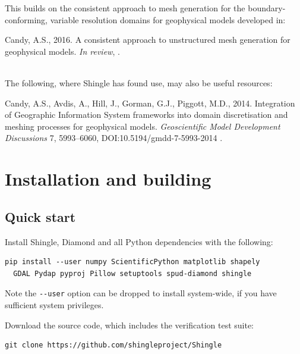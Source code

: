 \documentclass[a4paper, 10pt]{book}
\providecommand{\shingle}{Shingle\xspace}
\begin{document}
\medskip
\noindent
This builds on the consistent approach to mesh generation for the boundary-conforming, variable resolution domains for  geophysical models developed in:
\par\vskip 4pt\noindent\hspace{0.02\columnwidth}%
\begin{minipage}{0.9\columnwidth}%
Candy, A.S., 2016. A consistent approach to unstructured mesh generation for geophysical models. \emph{In review}, \citep{candybrep}.
\end{minipage}
\\

\medskip
\noindent
The following, where \shingle has found use, may also be useful resources:
\par\vskip 4pt\noindent\hspace{0.02\columnwidth}%
\begin{minipage}{0.9\columnwidth}%
Candy, A.S., Avdis, A., Hill, J., Gorman, G.J., Piggott, M.D., 2014.
Integration of Geographic Information System frameworks into domain discretisation and meshing processes for geophysical models.
\emph{Geoscientific Model Development Discussions} 7, 5993--6060, DOI:10.5194/gmdd-7-5993-2014 \citep{candygis}.
\end{minipage}




\chapter{Installation and building}
%
\section{Quick start}

\noindent
Install \shingle, Diamond and all Python dependencies with the following:
\begin{verbatim}
pip install --user numpy ScientificPython matplotlib shapely
  GDAL Pydap pyproj Pillow setuptools spud-diamond shingle
\end{verbatim}
Note the \verb+--user+ option can be dropped to install system-wide, if you have sufficient system privileges. 
\vspace{1ex}

\noindent
Download the source code, which includes the verification test suite:
\begin{verbatim}
git clone https://github.com/shingleproject/Shingle
\end{verbatim}
\end{document}
